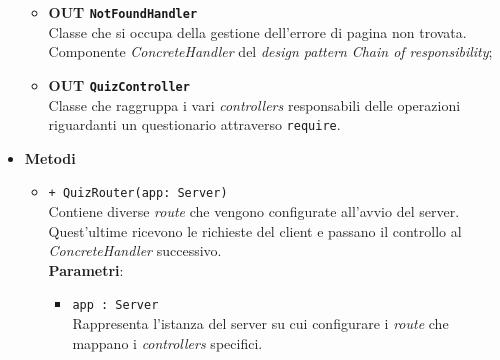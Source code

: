 \begin{itemize}
\begin{itemize}
		\item \textbf{OUT \texttt{NotFoundHandler}} \\
			Classe che si occupa della gestione dell'errore di pagina non trovata. Componente \textit{ConcreteHandler} del \textit{design pattern} \textit{Chain of responsibility};
		\item \textbf{OUT \texttt{QuizController}} \\
			Classe che raggruppa i vari \textit{controllers} responsabili delle operazioni riguardanti un questionario attraverso \texttt{require}.
		\end{itemize}
		\item \textbf{Metodi} 
		\begin{itemize}
		\item \texttt{+ QuizRouter(app: Server)} \\
		Contiene diverse \textit{route} che vengono configurate all'avvio del server. Quest'ultime ricevono le richieste del client e passano il controllo al \textit{ConcreteHandler} successivo. \\
		\textbf{Parametri}:
		\begin{itemize}
		\item \texttt{app : Server} \\
		Rappresenta l'istanza del server su cui configurare i \textit{route} che mappano i \textit{controllers} specifici.
		\end{itemize}
		\end{itemize}
	\end{itemize}